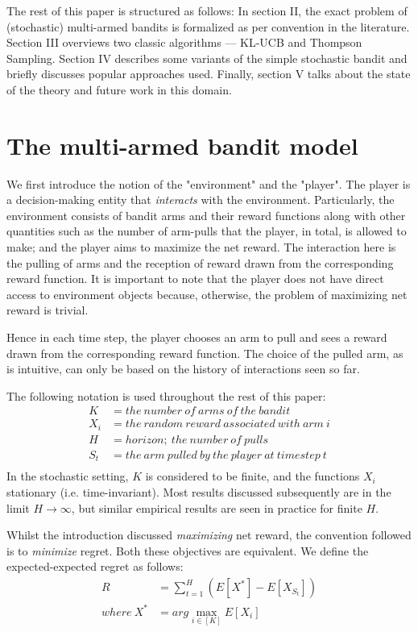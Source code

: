 \documentclass[conference]{IEEEtran}
\begin{document}
The rest of this paper is structured as follows: In section II, the exact problem of (stochastic) multi-armed bandits is formalized as per convention in the literature. Section III overviews two classic algorithms — KL-UCB and Thompson Sampling. Section IV describes some variants of the simple stochastic bandit and briefly discusses popular approaches used. Finally, section V talks about the state of the theory and future work in this domain.

\section{The multi-armed bandit model}
We first introduce the notion of the "environment" and the "player". The player is a decision-making entity that \textit{interacts} with the environment. Particularly, the environment consists of bandit arms and their reward functions along with other quantities such as the number of arm-pulls that the player, in total, is allowed to make; and the player aims to maximize the net reward. The interaction here is the pulling of arms and the reception of reward drawn from the corresponding reward function. It is important to note that the player does not have direct access to environment objects because, otherwise, the problem of maximizing net reward is trivial.

Hence in each time step, the player chooses an arm to pull and sees a reward drawn from the corresponding reward function. The choice of the pulled arm, as is intuitive, can only be based on the history of interactions seen so far.

The following notation is used throughout the rest of this paper:
\begin{align*}
    K &= the\ number\ of\ arms\ of\ the\ bandit\\
    X_i &= the\ random\ reward\ associated\ with\ arm\ i\\
    H &= horizon;\ the\ number\ of\ pulls\\
    S_t &= the\ arm\ pulled\ by\ the\ player\ at\ time step\ t\\
\end{align*}
In the stochastic setting, $K$ is considered to be finite, and the functions $X_i$ stationary (i.e. time-invariant). Most results discussed subsequently are in the limit $H \to \infty$, but similar empirical results are seen in practice for finite $H$.

Whilst the introduction discussed \textit{maximizing} net reward, the convention followed is to \textit{minimize} regret. Both these objectives are equivalent. We define the expected-expected regret as follows:
\begin{align*}
    R &= \sum_{t=1}^H (E[X^*] - E[X_{S_t}])\\
    where\ X^* &= arg\max_{i \in [K]} E[X_i]
\end{align*}
\end{document}
